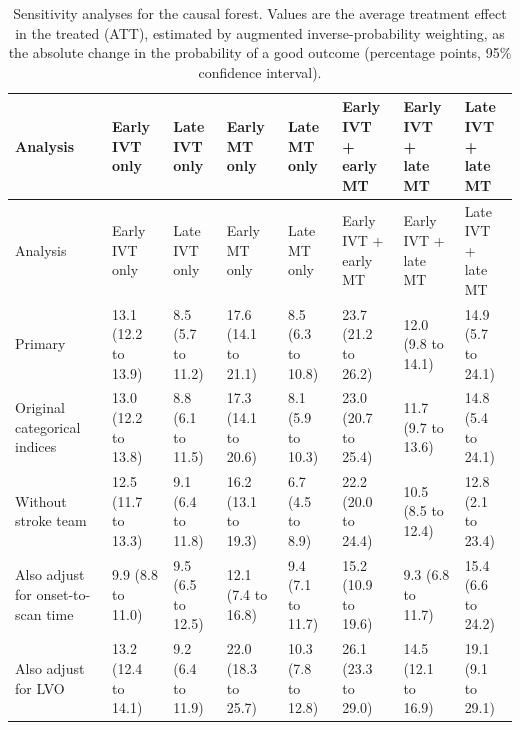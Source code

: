 \begin{landscape}
{
\scriptsize
\begin{longtable}[]{@{}llllllll@{}}
\caption{Sensitivity analyses for the causal forest. Values are the average treatment effect in the treated (ATT), estimated by augmented inverse-probability weighting, as the absolute change in the probability of a good outcome (percentage points, 95\% confidence interval).}
\label{tab:sens_cf}\\
\toprule
Analysis & \makecell[l]{Early IVT\\only} & \makecell[l]{Late IVT\\only} & \makecell[l]{Early MT\\only} & \makecell[l]{Late MT\\only} & \makecell[l]{Early IVT +\\early MT} & \makecell[l]{Early IVT +\\late MT} & \makecell[l]{Late IVT +\\late MT} \\
\midrule
\endfirsthead
\toprule
Analysis & \makecell[l]{Early IVT\\only} & \makecell[l]{Late IVT\\only} & \makecell[l]{Early MT\\only} & \makecell[l]{Late MT\\only} & \makecell[l]{Early IVT +\\early MT} & \makecell[l]{Early IVT +\\late MT} & \makecell[l]{Late IVT +\\late MT} \\
\midrule
\endhead
\bottomrule
\endlastfoot
Primary & 13.1 (12.2 to 13.9) & 8.5 (5.7 to 11.2) & 17.6 (14.1 to 21.1) & 8.5 (6.3 to 10.8) & 23.7 (21.2 to 26.2) & 12.0 (9.8 to 14.1) & 14.9 (5.7 to 24.1) \\
Original categorical indices & 13.0 (12.2 to 13.8) & 8.8 (6.1 to 11.5) & 17.3 (14.1 to 20.6) & 8.1 (5.9 to 10.3) & 23.0 (20.7 to 25.4) & 11.7 (9.7 to 13.6) & 14.8 (5.4 to 24.1) \\
Without stroke team & 12.5 (11.7 to 13.3) & 9.1 (6.4 to 11.8) & 16.2 (13.1 to 19.3) & 6.7 (4.5 to 8.9) & 22.2 (20.0 to 24.4) & 10.5 (8.5 to 12.4) & 12.8 (2.1 to 23.4) \\
Also adjust for onset-to-scan time & 9.9 (8.8 to 11.0) & 9.5 (6.5 to 12.5) & 12.1 (7.4 to 16.8) & 9.4 (7.1 to 11.7) & 15.2 (10.9 to 19.6) & 9.3 (6.8 to 11.7) & 15.4 (6.6 to 24.2) \\
Also adjust for LVO & 13.2 (12.4 to 14.1) & 9.2 (6.4 to 11.9) & 22.0 (18.3 to 25.7) & 10.3 (7.8 to 12.8) & 26.1 (23.3 to 29.0) & 14.5 (12.1 to 16.9) & 19.1 (9.1 to 29.1) \\

\end{longtable}}
\end{landscape}
